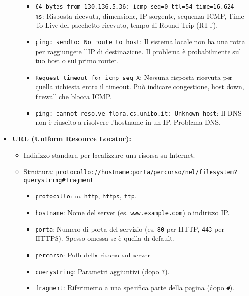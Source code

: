\begin{itemize}
\begin{itemize}
\begin{itemize}
            \item \texttt{64 bytes from 130.136.5.36: icmp\_seq=0 ttl=54 time=16.624 ms}: Risposta ricevuta, dimensione, IP sorgente, sequenza ICMP, Time To Live del pacchetto ricevuto, tempo di Round Trip (RTT).
            \item \texttt{ping: sendto: No route to host}: Il sistema locale non ha una rotta per raggiungere l'IP di destinazione. Il problema è probabilmente sul tuo host o sul primo router.
            \item \texttt{Request timeout for icmp\_seq X}: Nessuna risposta ricevuta per quella richiesta entro il timeout. Può indicare congestione, host down, firewall che blocca ICMP.
            \item \texttt{ping: cannot resolve flora.cs.unibo.it: Unknown host}: Il DNS non è riuscito a risolvere l'hostname in un IP. Problema DNS.
        \end{itemize}
    \end{itemize}
    \item \textbf{URL (Uniform Resource Locator):}
    \begin{itemize}
        \item Indirizzo standard per localizzare una risorsa su Internet.
        \item Struttura: \texttt{protocollo://hostname:porta/percorso/nel/filesystem?querystring\#fragment}
        \begin{itemize}
            \item \texttt{protocollo}: es. \texttt{http}, \texttt{https}, \texttt{ftp}.
            \item \texttt{hostname}: Nome del server (es. \texttt{www.example.com}) o indirizzo IP.
            \item \texttt{porta}: Numero di porta del servizio (es. \texttt{80} per HTTP, \texttt{443} per HTTPS). Spesso omessa se è quella di default.
            \item \texttt{percorso}: Path della risorsa sul server.
            \item \texttt{querystring}: Parametri aggiuntivi (dopo \texttt{?}).
            \item \texttt{fragment}: Riferimento a una specifica parte della pagina (dopo \texttt{\#}).
        \end{itemize}
    \end{itemize}
\end{itemize}

